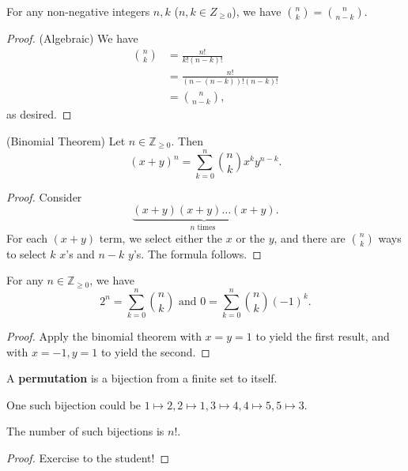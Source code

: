 \begin{lemma}
	For any non-negative integers \( n,k \) (\( n,k \in Z_{\ge 0} \)), we have \( \binom{n}{k} = \binom{n}{n-k} \).
\end{lemma}
\begin{proof}
	(Algebraic) We have 
	\begin{align*}
		\binom{n}{k} &= \frac{n!}{k!(n-k)!} \\
								 &= \frac{n!}{(n-(n-k))!(n-k)!} \\
								 &= \binom{n}{n-k}
	,\end{align*} as desired.
\end{proof}

\begin{theorem}
	(Binomial Theorem) Let \( n \in \mathbb{Z}_{\ge 0}\). Then \[
		(x+y)^n = \sum_{k=0}^{n} \binom{n}{k} x^k y^{n-k}
	.\] 
\end{theorem}
\begin{proof}
	Consider \[ 
		\underbrace{(x+y)(x+y)\ldots (x+y)}_{n \text{ times } }
	.\] For each \( (x+y) \) term, we select either the \( x \) or the \( y \), and there are \( \binom{n}{k} \) ways to select \( k \) \( x \)'s and \( n-k \) \( y \)'s. The formula follows.
\end{proof}

\begin{corollary}
	For any \( n \in \mathbb{Z}_{\ge 0} \), we have \[ 
		2^n=\sum_{k=0}^{n} \binom{n}{k} \text{ and } 0=\sum_{k=0}^{n} \binom{n}{k} (-1)^k 
	.\]
\end{corollary}
\begin{proof}
	Apply the binomial theorem with \( x=y=1 \) to yield the first result, and with \( x=-1, y=1 \) to yield the second.
\end{proof}

\begin{definition}
	A \textbf{permutation} is a bijection from a finite set to itself.
\end{definition}

\begin{eg}
	One such bijection could be \( 1 \mapsto 2, 2 \mapsto 1, 3 \mapsto 4, 4 \mapsto 5, 5 \mapsto 3 \).
\end{eg}

\begin{lemma}
	The number of such bijections is \( n! \).
\end{lemma}
\begin{proof}
	Exercise to the student!
\end{proof}
